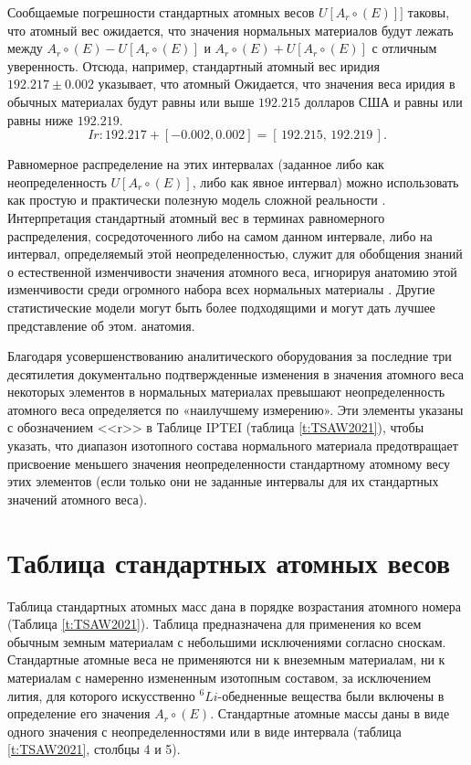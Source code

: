 \documentclass[a5paper,openany]{book}
\begin{document}
Сообщаемые погрешности стандартных атомных весов $U[ A_{r}{\circ}(E)]]$ таковы, что атомный вес
ожидается, что значения нормальных материалов будут лежать между $A_{r}{\circ}(E)-U[ A_{r}{\circ}(E)]$ и $A_{r}{\circ}(E) +U[ A_{r}{\circ}(E)]$ с отличным
уверенность. Отсюда, например, стандартный атомный вес иридия $192.217 \pm 0.002$ указывает, что атомный
Ожидается, что значения веса иридия в обычных материалах будут равны или выше $192.215$ долларов США и равны или равны
ниже $192.219$.
\begin{equation*} 
 Ir: 	192.217+ [ -0.002, 0.002] =  [ \, 192.215, \,  192.219 \, ].  
\end{equation*} 

Равномерное распределение на этих интервалах (заданное либо как неопределенность $U[ A_{r}{\circ}(E)]$, либо как явное
интервал) можно использовать как простую и практически полезную модель сложной реальности \cite{IUPAC2018}. Интерпретация
стандартный атомный вес в терминах равномерного распределения, сосредоточенного либо на самом данном интервале, либо на
интервал, определяемый этой неопределенностью, служит для обобщения знаний о естественной изменчивости
значения атомного веса, игнорируя анатомию этой изменчивости среди огромного набора всех нормальных
материалы \cite{IUPAC2018}. Другие статистические модели могут быть более подходящими и могут дать лучшее представление об этом.
анатомия.

Благодаря усовершенствованию аналитического оборудования за последние три десятилетия документально подтвержденные изменения в
значения атомного веса некоторых элементов в нормальных материалах превышают неопределенность атомного веса
определяется по «наилучшему измерению». Эти элементы указаны с обозначением <<r>> в Таблице IPTEI (таблица \ref{t:TSAW2021}), чтобы указать, что диапазон изотопного состава нормального материала предотвращает
присвоение меньшего значения неопределенности стандартному атомному весу этих элементов (если только они не
заданные интервалы для их стандартных значений атомного веса).

\section{Таблица стандартных атомных весов} \label{s:TableStandardAtomicWeights}

Таблица стандартных атомных масс дана в порядке возрастания атомного номера (Таблица \ref{t:TSAW2021}). Таблица предназначена для применения ко всем обычным земным материалам с небольшими исключениями 
согласно сноскам. Стандартные атомные веса не применяются ни к внеземным материалам, ни к материалам
с намеренно измененным изотопным составом, за исключением лития, для которого искусственно $^6Li$-обедненные вещества были включены в определение его значения $A_{r}{\circ}(E)$. Стандартные атомные массы даны в виде одного значения с неопределенностями или в виде интервала (таблица \ref{t:TSAW2021}, столбцы 4 и 5). 
\end{document}
